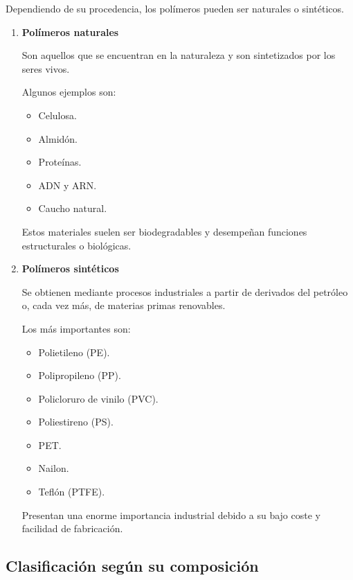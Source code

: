 Dependiendo de su procedencia, los polímeros pueden ser naturales o sintéticos.

\begin{enumerate}[label=\alph*)]

\item \textbf{Polímeros naturales}

Son aquellos que se encuentran en la naturaleza y son sintetizados por los seres vivos.

Algunos ejemplos son:

\begin{itemize}
\item Celulosa.
\item Almidón.
\item Proteínas.
\item ADN y ARN.
\item Caucho natural.
\end{itemize}

Estos materiales suelen ser biodegradables y desempeñan funciones estructurales o biológicas.

\item \textbf{Polímeros sintéticos}

Se obtienen mediante procesos industriales a partir de derivados del petróleo o, cada vez más, de materias primas renovables.

Los más importantes son:

\begin{itemize}
\item Polietileno (PE).
\item Polipropileno (PP).
\item Policloruro de vinilo (PVC).
\item Poliestireno (PS).
\item PET.
\item Nailon.
\item Teflón (PTFE).
\end{itemize}

Presentan una enorme importancia industrial debido a su bajo coste y facilidad de fabricación.

\end{enumerate}


\subsection{Clasificación según su composición}

